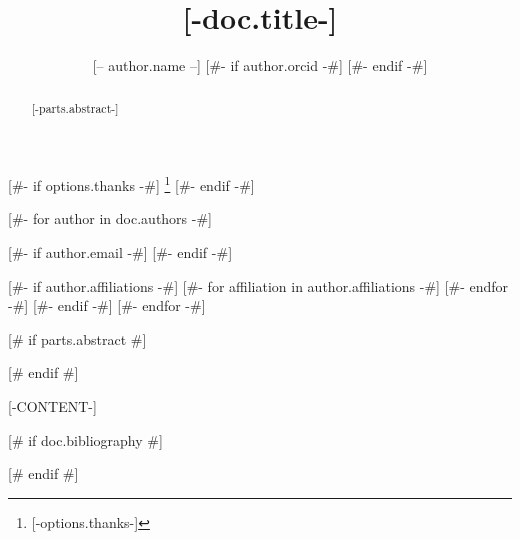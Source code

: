 \documentclass[preprint]{revtex4-2}
[# else #]
\begin{document}
\title{[-doc.title-]}
[#- if options.thanks -#]
\thanks{[-options.thanks-]}
[#- endif -#]

[#- for author in doc.authors -#]
\author{[-- author.name --]
[#- if author.orcid -#]
[#- endif -#]
}
[#- if author.email -#]
[#- endif -#]

[#- if author.affiliations -#]
[#- for affiliation in author.affiliations -#]
[#- endfor -#]
[#- endif -#]
[#- endfor -#]




\maketitle

[# if parts.abstract #]
\begin{abstract}
[-parts.abstract-]
\end{abstract}
[# endif #]

[-CONTENT-]

[# if doc.bibliography #]

[# endif #]
\end{document}
